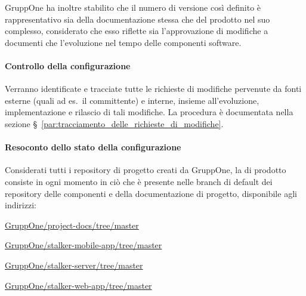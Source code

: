 \documentclass[../../norme-di-progetto.tex]{subfiles}
\begin{document}
GruppOne ha inoltre stabilito che il numero di versione così definito è rappresentativo sia della documentazione stessa che del prodotto nel suo complesso, considerato che esso riflette sia l'approvazione di modifiche a documenti che l'evoluzione nel tempo delle componenti software.



\paragraph{Controllo della configurazione}%
\label{par:controllo_della_configurazione}

Verranno identificate e tracciate tutte le richieste di modifiche pervenute da fonti esterne (quali ad es.\ il committente) e interne, insieme all'evoluzione, implementazione e rilascio di tali modifiche.
La procedura è documentata nella sezione §~\ref{par:tracciamento_delle_richieste_di_modifiche}.


\paragraph{Resoconto dello stato della configurazione}%
\label{par:resoconto_dello_stato_della_configurazione}

Considerati tutti i repository di progetto creati da GruppOne, la  di prodotto consiste in ogni momento in ciò che è presente nelle branch di default dei repository delle componenti e della documentazione di progetto, disponibile agli indirizzi:

\begin{description}
  \item \href{https://github.com/GruppOne/project-docs/tree/master}{GruppOne/project-docs/tree/master}
  \item \href{https://github.com/GruppOne/stalker-mobile-app/tree/master}{GruppOne/stalker-mobile-app/tree/master}
  \item \href{https://github.com/GruppOne/stalker-server/tree/master}{GruppOne/stalker-server/tree/master}
  \item \href{https://github.com/GruppOne/stalker-web-app/tree/master}{GruppOne/stalker-web-app/tree/master}
\end{description}
\end{document}

